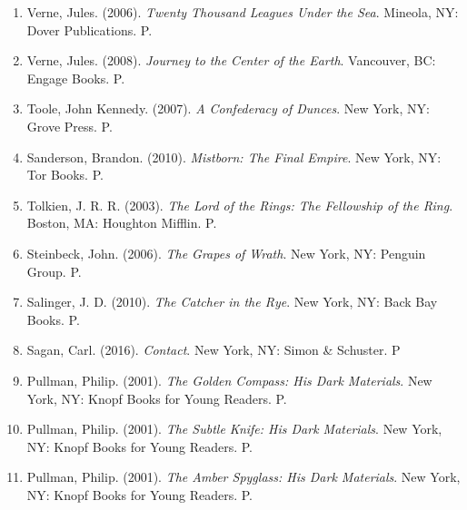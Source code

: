 \documentclass[11pt,a4paper]{article}
\begin{document}
\begin{enumerate}
   \item Verne, Jules. (2006). \textit{Twenty Thousand Leagues Under the Sea}. Mineola, NY: Dover Publications. P.
   \item Verne, Jules. (2008). \textit{Journey to the Center of the Earth}. Vancouver, BC: Engage Books. P.
   \item Toole, John Kennedy. (2007). \textit{A Confederacy of Dunces}. New York, NY: Grove Press. P.
   \item Sanderson, Brandon. (2010). \textit{Mistborn: The Final Empire}. New York, NY: Tor Books. P.
   \item Tolkien, J. R. R. (2003). \textit{The Lord of the Rings: The Fellowship of the Ring}. Boston, MA: Houghton Mifflin. P.
   \item Steinbeck, John. (2006). \textit{The Grapes of Wrath}. New York, NY: Penguin Group. P.
   \item Salinger, J. D. (2010). \textit{The Catcher in the Rye}. New York, NY: Back Bay Books. P.
   \item Sagan, Carl. (2016). \textit{Contact}. New York, NY: Simon \& Schuster. P
   \item Pullman, Philip. (2001). \textit{The Golden Compass: His Dark Materials}. New York, NY: Knopf Books for Young Readers. P. 
   \item Pullman, Philip. (2001). \textit{The Subtle Knife: His Dark Materials}. New York, NY: Knopf Books for Young Readers. P. 
   \item Pullman, Philip. (2001). \textit{The Amber Spyglass: His Dark Materials}. New York, NY: Knopf Books for Young Readers. P. 
   
   
\end{enumerate}
\end{document}
